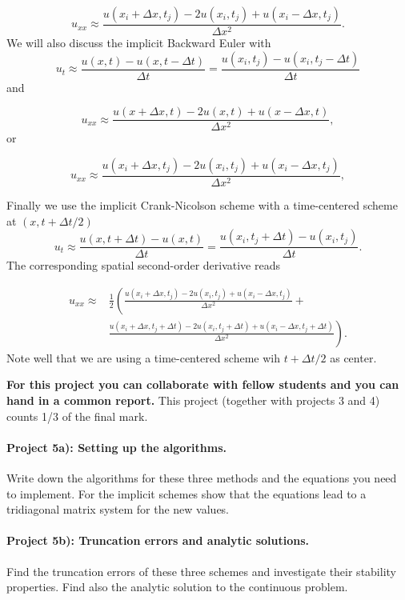 \documentclass[%
oneside,                 %
final,                   %
10pt]{article}
\begin{document}
\begin{equation*}
u_{xx}\approx \frac{u(x_i+\Delta x,t_j)-2u(x_i,t_j)+u(x_i-\Delta x,t_j)}{\Delta x^2}.
\end{equation*}
We will also discuss the implicit Backward Euler with   
\begin{equation*} 
u_t\approx \frac{u(x,t)-u(x,t-\Delta t)}{\Delta t}=\frac{u(x_i,t_j)-u(x_i,t_j-\Delta t)}{\Delta t}
\end{equation*}
and

\begin{equation*}
u_{xx}\approx \frac{u(x+\Delta x,t)-2u(x,t)+u(x-\Delta x,t)}{\Delta x^2},
\end{equation*}
or

\begin{equation*}
u_{xx}\approx \frac{u(x_i+\Delta x,t_j)-2u(x_i,t_j)+u(x_i-\Delta x,t_j)}{\Delta x^2},
\end{equation*}

Finally we use the implicit Crank-Nicolson scheme with  a time-centered scheme at $(x,t+\Delta t/2)$   
\begin{equation*} 
u_t\approx \frac{u(x,t+\Delta t)-u(x,t)}{\Delta t}=\frac{u(x_i,t_j+\Delta t)-u(x_i,t_j)}{\Delta t}.
\end{equation*}
The corresponding spatial second-order derivative reads

\begin{align*}
u_{xx}\approx &\frac{1}{2}\left(\frac{u(x_i+\Delta x,t_j)-2u(x_i,t_j)+u(x_i-\Delta x,t_j)}{\Delta x^2}\right. +\\
&\left. \frac{u(x_i+\Delta x,t_j+\Delta t)-2u(x_i,t_j+\Delta t)+u(x_i-\Delta x,t_j+\Delta t)}{\Delta x^2}\right).
\end{align*}
Note well that we are using a time-centered scheme wih $t+\Delta t/2$ as center.


\textbf{For this project you can collaborate with fellow students and you can  hand in a common report.}
This project (together with projects 3 and 4) counts 1/3 of the final mark.

\paragraph{Project 5a): Setting up the algorithms.}
Write down the algorithms for these three methods and the equations you need to implement.
For the implicit schemes show that the equations lead to a tridiagonal matrix system for the new values.

\paragraph{Project 5b): Truncation errors and analytic solutions.}
Find the truncation errors of these three schemes and investigate their stability properties.
Find also the analytic solution to the continuous problem. 
\end{document}
